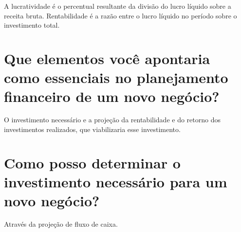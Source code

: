 \documentclass[a4paper,10pt]{article}
\begin{document}
A lucratividade é o percentual resultante da divisão do lucro líquido sobre a receita bruta. Rentabilidade é a razão entre o lucro líquido no período sobre o investimento total.

\section{Que elementos você apontaria como essenciais no planejamento financeiro de um novo negócio?}

 O investimento necessário e a projeção da rentabilidade e do retorno dos investimentos realizados, que viabilizaria esse investimento.

\section{Como  posso  determinar  o  investimento  necessário  para um novo negócio?}

Através da projeção de fluxo de caixa.
\end{document}
